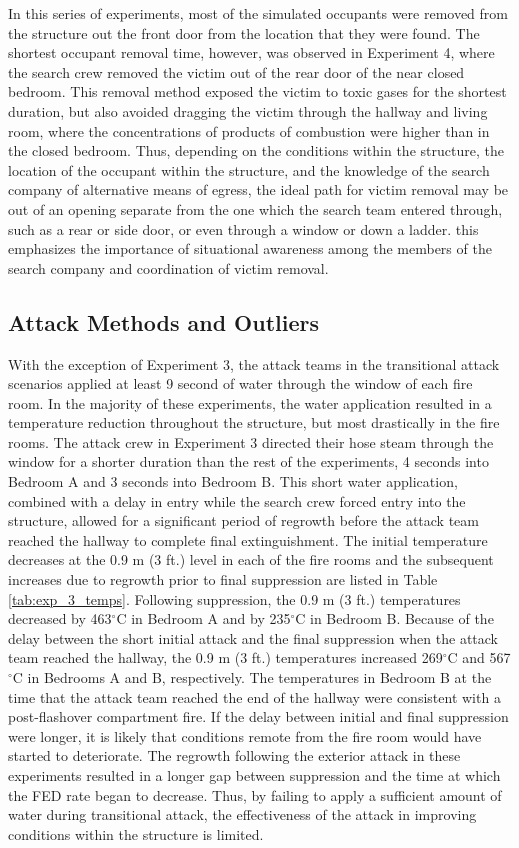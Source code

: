 \documentclass[12pt,oneside]{article}
\begin{document}
In this series of experiments, most of the simulated occupants were removed from the structure out the front door from the location that they were found. The shortest occupant removal time, however, was observed in Experiment 4, where the search crew removed the victim out of the rear door of the near closed bedroom. This removal method exposed the victim to toxic gases for the shortest duration, but also avoided dragging the victim through the hallway and living room, where the  concentrations of products of combustion were higher than in the closed bedroom. Thus, depending on the conditions within the structure, the location of the occupant within the structure, and the knowledge of the search company of alternative means of egress, the ideal path for victim removal may be out of an opening separate from the one which the search team entered through, such as a rear or side door, or even through a window or down a ladder. this emphasizes the importance of situational awareness among the members of the search company and coordination of victim removal. 

\subsection{Attack Methods and Outliers}
\label{subsec:fire_attack}

With the exception of Experiment 3, the attack teams in the transitional attack scenarios applied at least 9 second of water through the window of each fire room. In the majority of these experiments, the water application resulted in a temperature reduction throughout the structure, but most drastically in the fire rooms. The attack crew in Experiment 3 directed their hose steam through the window for a shorter duration than the rest of the experiments, 4 seconds into Bedroom A and 3 seconds into Bedroom B. This short water application, combined with a delay in entry while the search crew forced entry into the structure, allowed for a significant period of regrowth before the attack team reached the hallway to complete final extinguishment. The initial temperature decreases at the 0.9 m (3 ft.) level in each of the fire rooms and the subsequent increases due to regrowth prior to final suppression are listed in Table \ref{tab:exp_3_temps}. Following suppression, the 0.9 m (3 ft.) temperatures decreased by 463$^{\circ}$C in Bedroom A and by 235$^{\circ}$C in Bedroom B. Because of the delay between the short initial attack and the final suppression when the attack team reached the hallway, the 0.9 m (3 ft.) temperatures increased 269$^{\circ}$C and 567$^{\circ}$C in Bedrooms A and B, respectively. The temperatures in Bedroom B at the time that the attack team reached the end of the hallway were consistent with a post-flashover compartment fire. If the delay between initial and final suppression were longer, it is likely that conditions remote from the fire room would have started to deteriorate. The regrowth following the exterior attack in these experiments resulted in a longer gap between suppression and the time at which the FED rate began to decrease. Thus, by failing to apply a sufficient amount of water  during transitional attack, the effectiveness of the attack in improving conditions within the structure is limited. 
\end{document}
